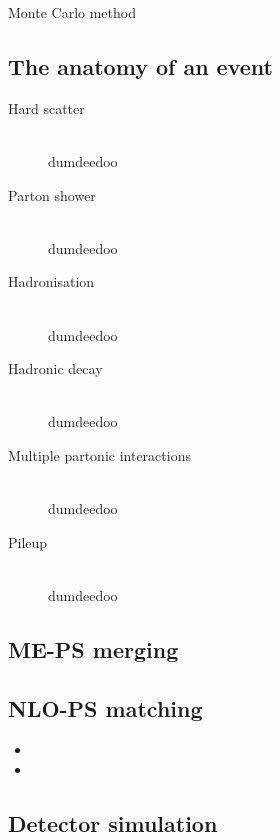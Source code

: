
Monte Carlo method

\subsection{The anatomy of an event}
\begin{description}
\item[Hard scatter] \hfill \\
	dumdeedoo
\item[Parton shower] \hfill \\
	dumdeedoo
\item[Hadronisation] \hfill \\
	dumdeedoo
\item[Hadronic decay] \hfill \\
	dumdeedoo
\item[Multiple partonic interactions] \hfill \\
	dumdeedoo
\item[Pileup] \hfill \\
	dumdeedoo
\end{description}

\subsection{ME-PS merging}

\subsection{NLO-PS matching}
\begin{itemize}
	\item \mcatnlo
	\item \powheg
\end{itemize}

\subsection{Detector simulation}